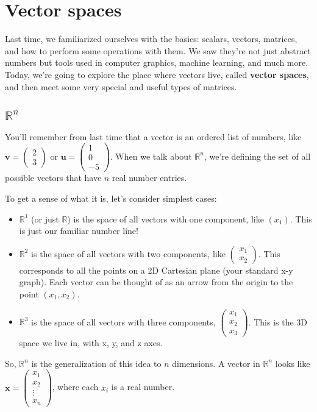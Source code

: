 \documentclass[11pt]{article}
\begin{document}



\section{Vector spaces}

Last time, we familiarized ourselves with the basics: scalars, vectors, matrices, and how to perform some operations with them. We saw they're not just abstract numbers but tools used in computer graphics, machine learning, and much more. Today, we're going to explore the place where vectors live, called \textbf{vector spaces}, and then meet some very special and useful types of matrices.

\subsection{$\mathbb{R}^n$}

You'll remember from last time that a vector is an ordered list of numbers, like $\mathbf{v} = \begin{pmatrix} 2 \\ 3 \end{pmatrix}$ or $\mathbf{u} = \begin{pmatrix} 1 \\ 0 \\ -5 \end{pmatrix}$.
When we talk about $\mathbb{R}^n$, we're defining the set of all possible vectors that have $n$ real number entries.

To get a sense of what it is, let's consider simplest cases:
\begin{itemize}
    \item $\mathbb{R}^1$ (or just $\mathbb{R}$) is the space of all vectors with one component, like $(x_1)$. This is just our familiar number line!
    \item $\mathbb{R}^2$ is the space of all vectors with two components, like $\begin{pmatrix} x_1 \\ x_2 \end{pmatrix}$. This corresponds to all the points on a 2D Cartesian plane (your standard x-y graph). Each vector can be thought of as an arrow from the origin to the point $(x_1, x_2)$.
    \item $\mathbb{R}^3$ is the space of all vectors with three components, $\begin{pmatrix} x_1 \\ x_2 \\ x_3 \end{pmatrix}$. This is the 3D space we live in, with x, y, and z axes.
\end{itemize}
So, $\mathbb{R}^n$ is the generalization of this idea to $n$ dimensions. A vector in $\mathbb{R}^n$ looks like $\mathbf{x} = \begin{pmatrix} x_1 \\ x_2 \\ \vdots \\ x_n \end{pmatrix}$, where each $x_i$ is a real number.
\end{document}
